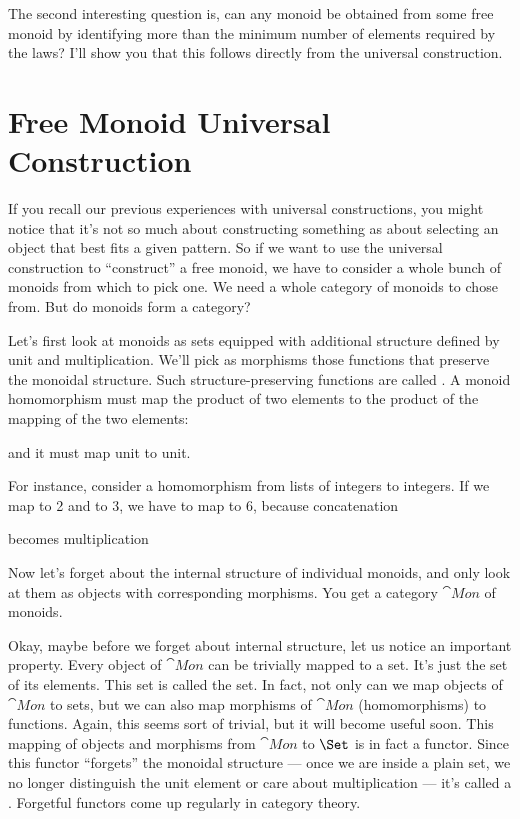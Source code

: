 The second interesting question is, can any monoid be obtained from some
free monoid by identifying more than the minimum number of elements
required by the laws? I'll show you that this follows directly from the
universal construction.

\section{Free Monoid Universal Construction}

If you recall our previous experiences with universal constructions, you
might notice that it's not so much about constructing something as about
selecting an object that best fits a given pattern. So if we want to use
the universal construction to ``construct'' a free monoid, we have to
consider a whole bunch of monoids from which to pick one. We need a
whole category of monoids to chose from. But do monoids form a category?

Let's first look at monoids as sets equipped with additional structure
defined by unit and multiplication. We'll pick as morphisms those
functions that preserve the monoidal structure. Such
structure-preserving functions are called . A monoid
homomorphism must map the product of two elements to the product of the
mapping of the two elements:

and it must map unit to unit.

For instance, consider a homomorphism from lists of integers to
integers. If we map \code{{[}2{]}} to 2 and \code{{[}3{]}} to 3, we
have to map \code{{[}2, 3{]}} to 6, because concatenation

becomes multiplication

Now let's forget about the internal structure of individual monoids, and
only look at them as objects with corresponding morphisms. You get a
category $\cat{Mon}$ of monoids.

Okay, maybe before we forget about internal structure, let us notice an
important property. Every object of $\cat{Mon}$ can be trivially mapped
to a set. It's just the set of its elements. This set is called the
 set. In fact, not only can we map objects of
$\cat{Mon}$ to sets, but we can also map morphisms of $\cat{Mon}$
(homomorphisms) to functions. Again, this seems sort of trivial, but it
will become useful soon. This mapping of objects and morphisms from
$\cat{Mon}$ to $\Set$ is in fact a functor. Since this functor
``forgets'' the monoidal structure --- once we are inside a plain set,
we no longer distinguish the unit element or care about multiplication
--- it's called a . Forgetful functors come up
regularly in category theory.

